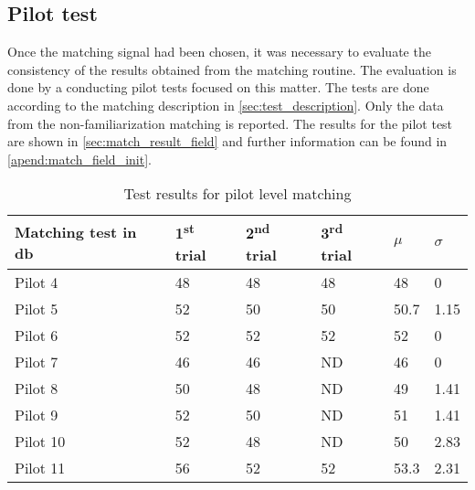 \subsection{Pilot test}
\label{sec:pilot_test}
Once the matching signal had been chosen, it was necessary to evaluate the consistency of the results obtained from the matching routine.
The evaluation is done by a conducting pilot tests focused on this matter. The tests are done according to the matching description in \autoref{sec:test_description}.%
Only the data from the non-familiarization matching is reported. The results for the pilot test are shown in \autoref{sec:match_result_field} and further information can be found in \autoref{apend:match_field_init}.

\begin{table}[H]
\centering
\caption{Test results for pilot level matching}
\begin{tabular}{l|lll|ll}
Matching test in \si{\decibel}   & 1\textsuperscript{st} trial & 2\textsuperscript{nd} trial & 3\textsuperscript{rd} trial & $\mu$ & $\sigma$ \\ \hline
Pilot 4  & 48          & 48           & 48          & 48          & 0                  \\
Pilot 5  & 52          & 50           & 50          & 50.7        & 1.15               \\
Pilot 6  & 52          & 52           & 52          & 52          & 0                  \\
Pilot 7  & 46          & 46           & ND          & 46          & 0                  \\
Pilot 8  & 50          & 48           & ND          & 49          & 1.41               \\
Pilot 9  & 52          & 50           & ND          & 51          & 1.41               \\
Pilot 10  & 52          & 48           & ND          & 50          & 2.83               \\
Pilot 11  & 56          & 52           & 52          & 53.3        & 2.31             
\end{tabular}
\label{sec:match_result_field}
\end{table}

